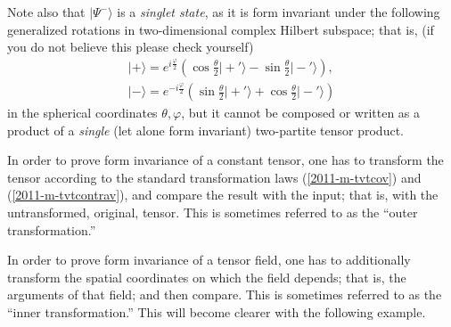 {Note also that $\vert \Psi^-\rangle$ is a {\em singlet state},
as it is form invariant under the following generalized rotations in two-dimensional complex Hilbert subspace; that is,
(if you do not believe this please check yourself)
\begin{equation}
\begin{split}
\vert + \rangle =
e^{ i{\frac{\varphi}{2}} }
\left(
\cos \frac{\theta}{2} \vert +'  \rangle
-
\sin \frac{\theta}{2} \vert -'   \rangle
\right),
\\
 \vert - \rangle =
e^{ -i{\frac{\varphi}{2}} }
\left(
\sin \frac{\theta}{2} \vert +'   \rangle
+
\cos \frac{\theta}{2} \vert -'  \rangle
\right)
\end{split}
\end{equation}
in the spherical coordinates $\theta , \varphi$,
but it cannot be composed or written as a product of a {\em single} (let alone form invariant) two-partite tensor product.

\eexample
}


%
%

In order to prove form invariance of a constant tensor,
one has to transform the tensor according to the standard transformation laws
(\ref{2011-m-tvtcov}) and (\ref{2011-m-tvtcontrav}), and compare the result with the input;
that is, with the untransformed, original, tensor.
This is sometimes referred to as the ``outer transformation.''


In order to prove form invariance of a tensor field,
one has to additionally transform the spatial coordinates on which the field depends;
that is, the arguments of that field; and then compare.
This is sometimes referred to as the ``inner transformation.''
This will become clearer with the following example.

